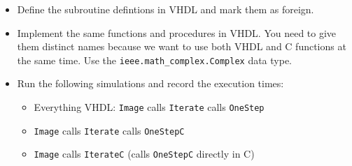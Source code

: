 \documentclass[12pt,epsf,makeidx,oneside]{book}
\begin{document}
\begin{itemize}[noitemsep]
    \item Define the subroutine defintions in VHDL and mark them as foreign.
    \item Implement the same functions and procedures in VHDL. You need to give them distinct names because we want to use both VHDL and C functions at the same time. Use the {\tt ieee.math\_complex.Complex} data type.
    \item Run the following simulations and record the execution times:
    \begin{itemize}[noitemsep]
      \item Everything VHDL: {\tt Image} calls {\tt Iterate} calls {\tt OneStep}
      \item {\tt Image} calls {\tt Iterate} calls {\tt OneStepC}
      \item {\tt Image} calls {\tt IterateC} (calls {\tt OneStepC} directly in C)
    \end{itemize}
  \end{itemize}
\end{document}
